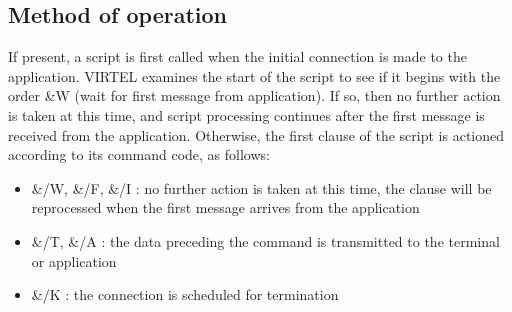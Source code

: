 \documentclass[letterpaper,10pt,english]{sphinxmanual}
\begin{document}
\subsection{Method of operation}
\label{\detokenize{connectivity_guide:method-of-operation}}\label{\detokenize{connectivity_guide:index-121}}
\sphinxAtStartPar
If present, a script is first called when the initial connection is made to the application. VIRTEL examines the start of the script to see if it begins with the order \&W (wait for first message from application). If so, then no further action is taken at this time, and script processing continues after the first message is received from the application. Otherwise, the first clause of the script is actioned according to its command code, as follows:
\begin{itemize}
\item {} 
\sphinxAtStartPar
\&/W, \&/F, \&/I : no further action is taken at this time, the clause will be reprocessed when the first message arrives from the application

\item {} 
\sphinxAtStartPar
\&/T, \&/A : the data preceding the command is transmitted to the terminal or application

\item {} 
\sphinxAtStartPar
\&/K : the connection is scheduled for termination

\end{itemize}
\end{document}
